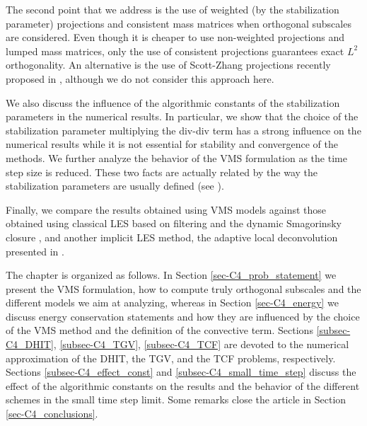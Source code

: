 The second point that we address is the use of weighted (by the stabilization parameter) projections and consistent mass matrices when orthogonal subscales are considered. Even though it is cheaper to use non-weighted projections and lumped mass matrices, only the use of consistent projections guarantees exact $L^2$ orthogonality. An alternative is the use of Scott-Zhang projections recently proposed in \cite{Badia2012}, although we do not consider this approach here.

We also discuss the influence of the algorithmic constants of the stabilization parameters in the numerical results. In particular, we show that the choice of the stabilization parameter multiplying the div-div term has a strong influence on the numerical results while it is not essential for stability and convergence of the methods. We further analyze the behavior of the VMS formulation as the time step size is reduced. These two facts are actually related by the way the stabilization parameters are usually defined (see \cite{gamnitzer_time-dependent_2010,Hsu2010}).

Finally, we compare the results obtained using VMS models against those obtained using classical LES based on filtering and the dynamic Smagorinsky closure \cite{fauconnier_construction_2009}, and another implicit LES method, the adaptive local deconvolution presented in \cite{hickel_adaptive_2006}. 

The chapter is organized as follows. In Section \ref{sec-C4_prob_statement} we present the VMS formulation, how to compute truly orthogonal subscales and the different models we aim at analyzing, whereas in Section \ref{sec-C4_energy} we discuss energy conservation statements and how they are influenced by the choice of the VMS method and the definition of the convective term. Sections \ref{subsec-C4_DHIT},  \ref{subsec-C4_TGV},  \ref{subsec-C4_TCF} are devoted to the numerical approximation of the DHIT, the TGV, and the TCF problems, respectively. Sections \ref{subsec-C4_effect_const} and \ref{subsec-C4_small_time_step} discuss the effect of the algorithmic constants on the results and the behavior of the different schemes in the small time step limit. Some remarks close the article in Section \ref{sec-C4_conclusions}.

